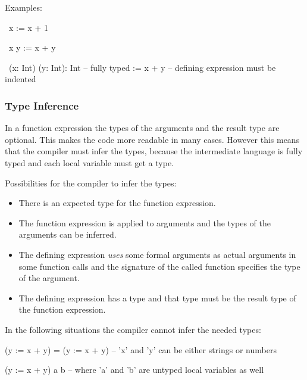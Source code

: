 \vskip 3mm
\noindent Examples:
\begin{alba}
    \ x := x + 1

    \ x y := x + y

    \ (x: Int) (y: Int): Int    -- fully typed
    :=
        x + y                   -- defining expression must be indented
\end{alba}



\subsubsection{Type Inference}

In a function expression the types of the arguments and the result type are
optional. This makes the code more readable in many cases. However this means
that the compiler must infer the types, because the intermediate language is
fully typed and each local variable must get a type.

\vskip 3mm
\noindent Possibilities for the compiler to infer the types:
\begin{itemize}

\item There is an expected type for the function expression.

\item The function expression is applied to arguments and the types of the
arguments can be inferred.

\item The defining expression  {\em uses} some formal arguments as
actual arguments in some function calls and the signature of the called function
specifies the type of the argument.

\item The defining expression has a type and that type must be the result type
of the function expression.

\end{itemize}

\noindent In the following situations the compiler cannot infer the needed types:
\begin{alba}
    (\x y := x + y) = (\x y := x + y)
    -- 'x' and 'y' can be either strings or numbers

    (\x y := x + y) a b
    -- where 'a' and 'b' are untyped local variables as well
\end{alba}






\vskip 5mm
